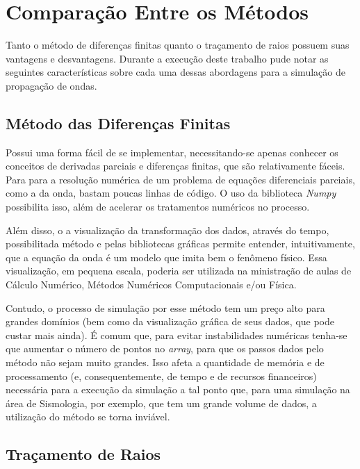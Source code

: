     \section{Comparação Entre os Métodos}
    
        Tanto o método de diferenças finitas quanto o traçamento de raios possuem suas vantagens e desvantagens. Durante a execução deste trabalho pude notar as seguintes características sobre cada uma dessas abordagens para a simulação de propagação de ondas.
        
        \subsection{Método das Diferenças Finitas}
        
            Possui uma forma fácil de se implementar, necessitando-se apenas conhecer os conceitos de derivadas parciais e diferenças finitas, que são relativamente fáceis. Para para a resolução numérica de um problema de equações diferenciais parciais, como a da onda, bastam poucas linhas de código. O uso da biblioteca \textit{Numpy} possibilita isso, além de acelerar os tratamentos numéricos no processo.
            
            Além disso, o a visualização da transformação dos dados, através do tempo, possibilitada método e pelas bibliotecas gráficas permite entender, intuitivamente, que a equação da onda é um modelo que imita bem o fenômeno físico. Essa visualização, em pequena escala, poderia ser utilizada na ministração de aulas de Cálculo Numérico, Métodos Numéricos Computacionais e/ou Física.
            
            Contudo, o processo de simulação por esse método tem um preço alto para grandes domínios (bem como da visualização gráfica de seus dados, que pode custar mais ainda). É comum que, para evitar instabilidades numéricas tenha-se que aumentar o número de pontos no \textit{array}, para que os passos dados pelo método não sejam muito grandes. Isso afeta a quantidade de memória e de processamento (e, consequentemente, de tempo e de recursos financeiros) necessária para a execução da simulação a tal ponto que, para uma simulação na área de Sismologia, por exemplo, que tem um grande volume de dados, a utilização do método se torna inviável.
            
        \subsection{Traçamento de Raios}
        
